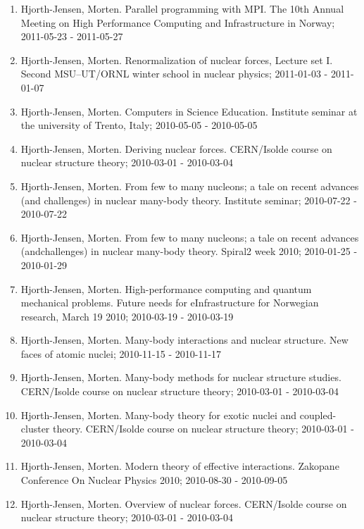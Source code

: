 \documentclass[%
oneside,                 %
final,                   %
10pt]{article}
\begin{document}
\begin{enumerate}
\item Hjorth-Jensen, Morten.  Parallel programming with MPI. The 10th Annual Meeting on High Performance Computing and Infrastructure in Norway; 2011-05-23 - 2011-05-27

\item Hjorth-Jensen, Morten.  Renormalization of nuclear forces, Lecture set I. Second MSU--UT/ORNL winter school in nuclear physics; 2011-01-03 - 2011-01-07

\item Hjorth-Jensen, Morten.  Computers in Science Education. Institute seminar at the university of Trento, Italy; 2010-05-05 - 2010-05-05

\item Hjorth-Jensen, Morten.  Deriving nuclear forces. CERN/Isolde course on nuclear structure theory; 2010-03-01 - 2010-03-04

\item Hjorth-Jensen, Morten.  From few to many nucleons; a tale on recent advances (and challenges) in nuclear many-body theory. Institute seminar; 2010-07-22 - 2010-07-22

\item Hjorth-Jensen, Morten.  From few to many nucleons; a tale on recent advances (andchallenges) in nuclear many-body theory. Spiral2 week 2010; 2010-01-25 - 2010-01-29

\item Hjorth-Jensen, Morten.  High-performance computing and quantum mechanical problems. Future needs for eInfrastructure for Norwegian research, March 19 2010; 2010-03-19 - 2010-03-19

\item Hjorth-Jensen, Morten.  Many-body interactions and nuclear structure. New faces of atomic nuclei; 2010-11-15 - 2010-11-17

\item Hjorth-Jensen, Morten.  Many-body methods for nuclear structure studies. CERN/Isolde course on nuclear structure theory; 2010-03-01 - 2010-03-04

\item Hjorth-Jensen, Morten.  Many-body theory for exotic nuclei and coupled-cluster theory. CERN/Isolde course on nuclear structure theory; 2010-03-01 - 2010-03-04

\item Hjorth-Jensen, Morten.  Modern theory of effective interactions. Zakopane Conference On Nuclear Physics 2010; 2010-08-30 - 2010-09-05

\item Hjorth-Jensen, Morten.  Overview of nuclear forces. CERN/Isolde course on nuclear structure theory; 2010-03-01 - 2010-03-04


\end{enumerate}
\end{document}
